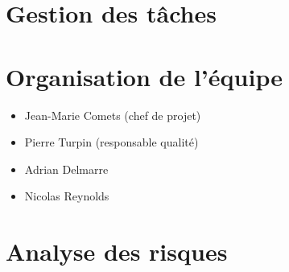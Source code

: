 \documentclass[11pt, a4paper]{article}
\begin{document}
\section{Gestion des tâches}

\section{Organisation de l’équipe}
\begin{itemize}
  \item Jean-Marie Comets (chef de projet)
  \item Pierre Turpin (responsable qualité)
  \item Adrian Delmarre
  \item Nicolas Reynolds
\end{itemize}

\section{Analyse des risques}
\end{document}
